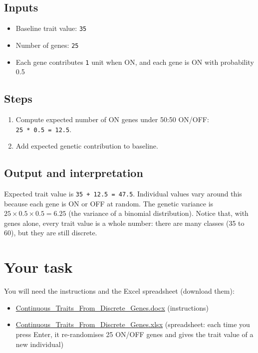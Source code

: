 \documentclass[
  a4paper]{book}
\providecommand{\tightlist}{%
  \setlength{\itemsep}{0pt}\setlength{\parskip}{0pt}}
\begin{document}
\subsection{Inputs}\label{inputs-8}

\begin{itemize}
\tightlist
\item
  Baseline trait value: \texttt{35}
\item
  Number of genes: \texttt{25}
\item
  Each gene contributes \texttt{1} unit when ON, and each gene is ON with probability 0.5
\end{itemize}

\subsection{Steps}\label{steps-8}

\begin{enumerate}
\def\labelenumi{\arabic{enumi}.}
\tightlist
\item
  Compute expected number of ON genes under 50:50 ON/OFF: \texttt{25\ *\ 0.5\ =\ 12.5}.
\item
  Add expected genetic contribution to baseline.
\end{enumerate}

\subsection{Output and interpretation}\label{output-and-interpretation-8}

Expected trait value is \texttt{35\ +\ 12.5\ =\ 47.5}. Individual values vary around this because each gene is ON or OFF at random. The genetic variance is \(25 \times 0.5 \times 0.5 = 6.25\) (the variance of a binomial distribution). Notice that, with genes alone, every trait value is a whole number: there are many classes (35 to 60), but they are still discrete.

\section{Your task}\label{your-task-23}

You will need the instructions and the Excel spreadsheet (download them):

\begin{itemize}
\tightlist
\item
  \href{https://github.com/jonesor/BB512_Book/raw/main/supplemental/Quantitative_Genetics/Continuous_Traits_From_Discrete_Genes.docx}{Continuous\_Traits\_From\_Discrete\_Genes.docx} (instructions)
\item
  \href{https://github.com/jonesor/BB512_Book/raw/main/supplemental/Quantitative_Genetics/Continuous_Traits_From_Discrete_Genes.xlsx}{Continuous\_Traits\_From\_Discrete\_Genes.xlsx} (spreadsheet: each time you press Enter, it re-randomises 25 ON/OFF genes and gives the trait value of a new individual)
\end{itemize}
\end{document}
